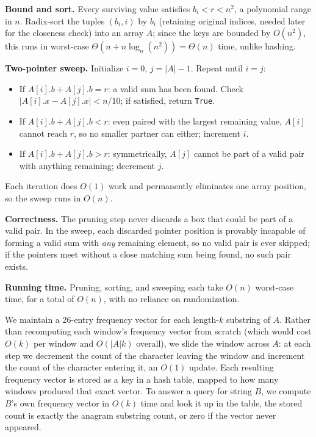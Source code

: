 \documentclass[12pt,twoside]{article}
\begin{document}
\begin{problems}
\begin{problemparts}
\textbf{Bound and sort.} Every surviving value satisfies $b_i < r < n^2$, a polynomial range in $n$. Radix-sort the tuples $(b_i, i)$ by $b_i$ (retaining original indices, needed later for the closeness check) into an array $A$; since the keys are bounded by $O(n^2)$, this runs in worst-case $\Theta(n + n\log_n(n^2)) = \Theta(n)$ time, unlike hashing.

\textbf{Two-pointer sweep.} Initialize $i=0$, $j=|A|-1$. Repeat until $i=j$:
\begin{itemize}
  \item If $A[i].b + A[j].b = r$: a valid sum has been found. Check $|A[i].x - A[j].x| < n/10$; if satisfied, return \texttt{True}.
  \item If $A[i].b + A[j].b < r$: even paired with the largest remaining value, $A[i]$ cannot reach $r$, so no smaller partner can either; increment $i$.
  \item If $A[i].b + A[j].b > r$: symmetrically, $A[j]$ cannot be part of a valid pair with anything remaining; decrement $j$.
\end{itemize}
Each iteration does $O(1)$ work and permanently eliminates one array position, so the sweep runs in $O(n)$.

\textbf{Correctness.} The pruning step never discards a box that could be part of a valid pair. In the sweep, each discarded pointer position is provably incapable of forming a valid sum with \emph{any} remaining element, so no valid pair is ever skipped; if the pointers meet without a close matching sum being found, no such pair exists.

\textbf{Running time.} Pruning, sorting, and sweeping each take $O(n)$ worst-case time, for a total of $O(n)$, with no reliance on randomization.
 
\end{problemparts}

\newpage

\problem %

\begin{problemparts}
 
\problempart %
We maintain a 26-entry frequency vector for each length-$k$ substring of $A$. Rather than recomputing each window's frequency vector from scratch (which would cost $O(k)$ per window and $O(|A|k)$ overall), we slide the window across $A$: at each step we decrement the count of the character leaving the window and increment the count of the character entering it, an $O(1)$ update. Each resulting frequency vector is stored as a key in a hash table, mapped to how many windows produced that exact vector. To answer a query for string $B$, we compute $B$'s own frequency vector in $O(k)$ time and look it up in the table, the stored count is exactly the anagram substring count, or zero if the vector never appeared.
 

\end{problemparts}
\end{problems}
\end{document}
